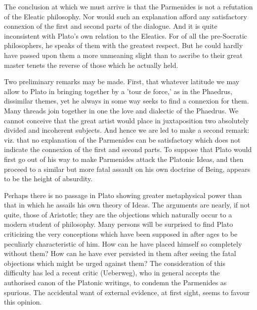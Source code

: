 The conclusion at which we must arrive is that the Parmenides is not
a refutation of the Eleatic philosophy. Nor would such an explanation
afford any satisfactory connexion of the first and second parts of the
dialogue. And it is quite inconsistent with Plato's own relation to the
Eleatics. For of all the pre-Socratic philosophers, he speaks of them
with the greatest respect. But he could hardly have passed upon them a
more unmeaning slight than to ascribe to their great master tenets the
reverse of those which he actually held.

Two preliminary remarks may be made. First, that whatever latitude we
may allow to Plato in bringing together by a 'tour de force,' as in the
Phaedrus, dissimilar themes, yet he always in some way seeks to find
a connexion for them. Many threads join together in one the love and
dialectic of the Phaedrus. We cannot conceive that the great artist
would place in juxtaposition two absolutely divided and incoherent
subjects. And hence we are led to make a second remark: viz. that
no explanation of the Parmenides can be satisfactory which does not
indicate the connexion of the first and second parts. To suppose that
Plato would first go out of his way to make Parmenides attack the
Platonic Ideas, and then proceed to a similar but more fatal assault on
his own doctrine of Being, appears to be the height of absurdity.

Perhaps there is no passage in Plato showing greater metaphysical power
than that in which he assails his own theory of Ideas. The arguments are
nearly, if not quite, those of Aristotle; they are the objections which
naturally occur to a modern student of philosophy. Many persons will be
surprised to find Plato criticizing the very conceptions which have been
supposed in after ages to be peculiarly characteristic of him. How can
he have placed himself so completely without them? How can he have ever
persisted in them after seeing the fatal objections which might be urged
against them? The consideration of this difficulty has led a recent
critic (Ueberweg), who in general accepts the authorised canon of the
Platonic writings, to condemn the Parmenides as spurious. The accidental
want of external evidence, at first sight, seems to favour this opinion.

